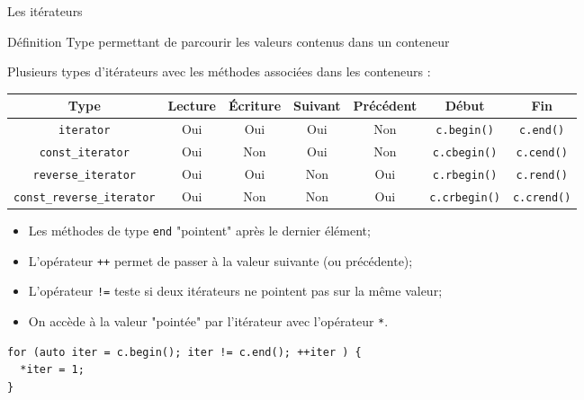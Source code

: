 \documentclass[compress,10pt,aspectratio=169]{beamer}
\begin{document}
\begin{frame}[fragile]{Les itérateurs}
    \scriptsize
    \begin{block}{\small Définition}
Type permettant de parcourir les valeurs contenus dans un conteneur
    \end{block}

    Plusieurs types d'itérateurs avec les méthodes associées dans les conteneurs :
\begin{tabular}{|c|c|c|c|c|c|c|}\hline
Type & Lecture & \'Ecriture &Suivant & Précédent & Début & Fin \\ \hline\hline
    \texttt{iterator} & Oui & Oui & Oui & Non & \texttt{c.begin()} & \texttt{c.end()}\\ \hline
    \texttt{const\_iterator} & Oui & Non & Oui & Non & \texttt{c.cbegin()} & \texttt{c.cend()}\\ \hline
    \texttt{reverse\_iterator} & Oui & Oui & Non & Oui & \texttt{c.rbegin()} & \texttt{c.rend()}\\ \hline
    \texttt{const\_reverse\_iterator} & Oui & Non & Non & Oui & \texttt{c.crbegin()} & \texttt{c.crend()}\\ \hline
\end{tabular}

\begin{itemize}
\item Les méthodes de type \texttt{end} "pointent" après le dernier élément;
\item L'opérateur \texttt{++} permet de passer à la valeur suivante (ou précédente);
\item L'opérateur \texttt{!=} teste si deux itérateurs ne pointent pas sur la même valeur;
\item On accède à la valeur "pointée" par l'itérateur avec l'opérateur \texttt{*}.
\end{itemize}

\begin{verbatim}
for (auto iter = c.begin(); iter != c.end(); ++iter ) { 
  *iter = 1;
}
\end{verbatim}
\end{frame}
\end{document}
